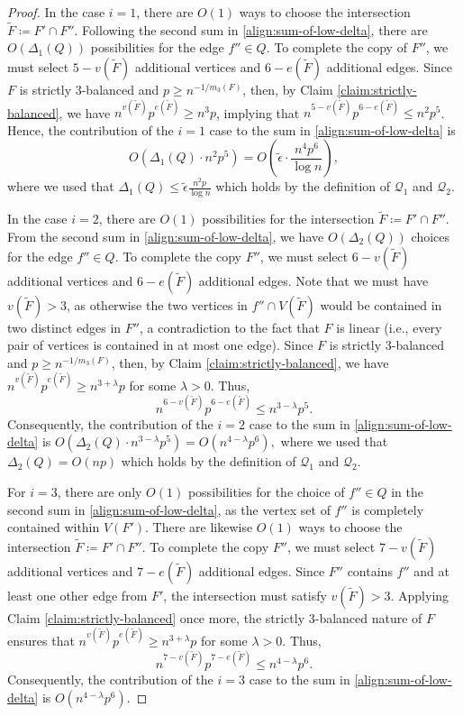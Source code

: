 \documentclass[10pt,a4paper]{amsart}
\newcommand{\cQ}{\mathcal{Q}}
\renewcommand{\ge}{\geqslant}
\renewcommand{\le}{\leqslant}
\begin{document}
\begin{proof}
    In the case $i = 1$, there are $O(1)$ ways to choose the intersection $\tilde{F} \coloneqq F' \cap F''$. Following the second sum in \eqref{align:sum-of-low-delta}, there are $O(\Delta_1(Q))$ possibilities for the edge $f'' \in Q$. To complete the copy of $F''$, we must select $5 - v(\tilde{F})$ additional vertices and $6 - e(\tilde{F})$ additional edges. Since $F$ is strictly $3$-balanced and $p \ge n^{-1/m_3(F)}$, then, by Claim \ref{claim:strictly-balanced}, we have $n^{v(\tilde{F})} p^{e(\tilde{F})} \ge n^3 p$, implying that $n^{5 - v(\tilde{F})} p^{6 - e(\tilde{F})} \le n^{2} p^{5}$. 
    Hence, the contribution of the $i=1$ case to the sum in \eqref{align:sum-of-low-delta} is
    \[
        O\left(\Delta_1(Q) \cdot n^{2} p^{5}\right) = O\left(\tilde{\epsilon} \cdot \frac{n^{4} p^{6}}{\log n}\right),
    \]
where we used that $\Delta_1(Q) \le \tilde{\epsilon} \frac{n^2 p}{\log n}$ which holds by the definition of $\cQ_1$ and $\cQ_2$.

    In the case $i=2$, there are $O(1)$ possibilities for the intersection $\tilde{F} \coloneqq F' \cap F''$. From the second sum in \eqref{align:sum-of-low-delta}, we have $O(\Delta_2(Q))$ choices for the edge $f'' \in Q$. To complete the copy $F''$, we must select $6 - v(\tilde{F})$ additional vertices and $6 - e(\tilde{F})$ additional edges. Note that we must have $v(\tilde{F}) > 3$, as otherwise the two vertices in $f'' \cap V(\tilde{F})$ would be contained in two distinct edges in $F''$, a contradiction to the fact that $F$ is linear (i.e., every pair of vertices is contained in at most one edge). Since $F$ is strictly $3$-balanced and $p \ge n^{-1/m_3(F)}$, then, by Claim \ref{claim:strictly-balanced}, we have $n^{v(\tilde{F})} p^{e(\tilde{F})} \ge n^{3 + \lambda} p$ for some $\lambda > 0$. Thus, 
    \[
        n^{6 - v(\tilde{F})} p^{6 - e(\tilde{F})} \le n^{3 - \lambda} p^{5}.
    \]
    Consequently, the contribution of the $i=2$ case to the sum in \eqref{align:sum-of-low-delta} is
    $O\left(\Delta_2(Q) \cdot n^{3 - \lambda} p^{5}\right) = O\left(n^{4 - \lambda} p^{6}\right),$
where we used that $\Delta_2(Q) = O(np)$ which holds by the definition of $\cQ_1$ and $\cQ_2$.

    For $i=3$, there are only $O(1)$ possibilities for the choice of $f'' \in Q$ in the second sum in \eqref{align:sum-of-low-delta}, as the vertex set of $f''$ is completely contained within $V(F')$. There are likewise $O(1)$ ways to choose the intersection $\tilde{F} \coloneqq F' \cap F''$. To complete the copy $F''$, we must select $7 - v(\tilde{F})$ additional vertices and $7 - e(\tilde{F})$ additional edges. Since $F''$ contains $f''$ and at least one other edge from $F'$, the intersection must satisfy $v(\tilde{F}) > 3$. Applying Claim \ref{claim:strictly-balanced} once more, the strictly $3$-balanced nature of $F$ ensures that $n^{v(\tilde{F})} p^{e(\tilde{F})} \ge n^{3 + \lambda} p$ for some $\lambda > 0$. Thus, 
    \[
        n^{7 - v(\tilde{F})} p^{7 - e(\tilde{F})} \le n^{4 - \lambda} p^{6}.
    \]
    Consequently, the contribution of the $i=3$ case to the sum in \eqref{align:sum-of-low-delta} is $O\left(n^{4 - \lambda} p^{6}\right)$.


\end{proof}
\end{document}
